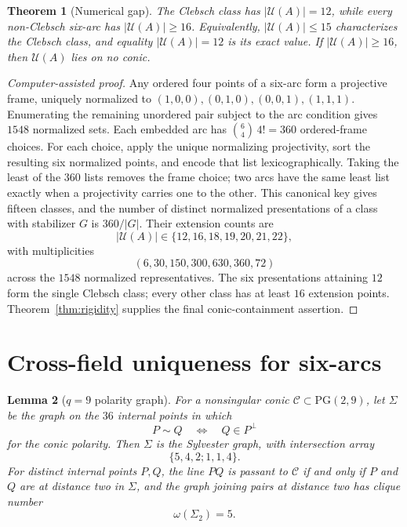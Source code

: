 \documentclass[11pt]{article}
\newtheorem{theorem}{Theorem}[section]
\newtheorem{lemma}[theorem]{Lemma}
\theoremstyle{remark}
\newcommand{\PG}{\mathrm{PG}}
\newcommand{\cC}{\mathcal{C}}
\newcommand{\cU}{\mathcal{U}}
\begin{document}
\begin{theorem}[Numerical gap]
\label{thm:gap}
The Clebsch class has $|\cU(A)|=12$, while every non-Clebsch
six-arc has $|\cU(A)|\ge16$. Equivalently, $|\cU(A)|\le15$
characterizes the Clebsch class, and equality $|\cU(A)|=12$ is its
exact value. If $|\cU(A)|\ge16$, then $\cU(A)$ lies on no conic.
\end{theorem}

\begin{proof}[Computer-assisted proof]
Any ordered four points of a six-arc form a projective frame, uniquely
normalized to
$(1,0,0),(0,1,0),(0,0,1),(1,1,1)$. Enumerating the remaining unordered pair
subject to the arc condition gives $1548$ normalized sets. Each embedded arc
has $\binom{6}{4}\,4!=360$ ordered-frame choices. For each choice, apply the
unique normalizing projectivity, sort the resulting six normalized points,
and encode that list lexicographically. Taking the least of the $360$ lists
removes the frame choice; two arcs have the same least list exactly when a
projectivity carries one to the other. This canonical key gives fifteen
classes, and the number of distinct normalized presentations of a class
with stabilizer $G$ is $360/|G|$. Their extension counts are
\[
 |\cU(A)|\in\{12,16,18,19,20,21,22\},
\]
with multiplicities
\[
 (6,30,150,300,630,360,72)
\]
across the $1548$ normalized representatives. The six presentations
attaining $12$ form the single Clebsch class; every other class has at
least $16$ extension points. Theorem~\ref{thm:rigidity} supplies the final
conic-containment assertion.
\end{proof}

\section{Cross-field uniqueness for six-arcs}

\begin{lemma}[$q=9$ polarity graph]
\label{lem:q9-polarity}
For a nonsingular conic $\cC\subset\PG(2,9)$, let $\Sigma$ be the graph on
the $36$ internal points in which
\[
 P\sim Q\quad\Longleftrightarrow\quad Q\in P^\perp
\]
for the conic polarity. Then $\Sigma$ is the Sylvester graph, with
intersection array
\[
 \{5,4,2;1,1,4\}.
\]
For distinct internal points $P,Q$, the line $PQ$ is passant to $\cC$ if
and only if $P$ and $Q$ are at distance two in $\Sigma$, and the graph
joining pairs at distance two has clique number
\[
 \omega(\Sigma_2)=5.
\]
\end{lemma}
\end{document}
